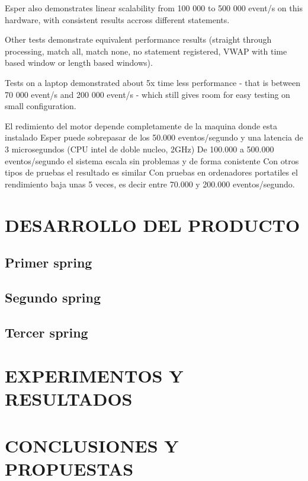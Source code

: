 \documentclass[spanish,twoside,openright,12pt,a4paper]{book}
\begin{document}
Esper also demonstrates linear scalability from 100 000 to 500 000 event/s on this 
hardware, with consistent results accross different statements.

Other tests demonstrate equivalent performance results
(straight through processing, match all, match none, no statement registered,
VWAP with time based window or length based windows).
                
Tests on a laptop demonstrated about 5x time less performance - that is 
between 70 000 event/s and 200 000 event/s - which still gives room for easy 
testing on small configuration.

El redimiento del motor depende completamente de la maquina donde esta instalado
Esper puede sobrepasar de los 50.000 eventos/segundo y una latencia de 3 microsegundos (CPU intel de doble nucleo, 2GHz)
De 100.000 a 500.000 eventos/segundo el sistema escala sin problemas y de forma conistente
Con otros tipos de pruebas el resultado es similar
Con pruebas en ordenadores portatiles el rendimiento baja unas 5 veces, es decir entre 70.000 y 200.000 eventos/segundo.



\chapter{DESARROLLO DEL PRODUCTO}
\label{CapituloDesarrollo}
\section{Primer spring}

\section{Segundo spring}

\section{Tercer spring}

\chapter{EXPERIMENTOS Y RESULTADOS}
\label{capituloExperimentosResultados}


\chapter{CONCLUSIONES Y PROPUESTAS}
\label{CapituloConclusiones}
\end{document}
